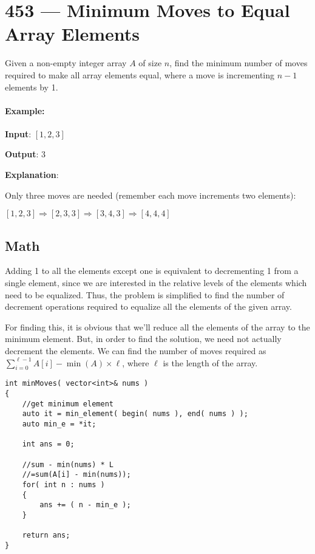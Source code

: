 \section{453 --- Minimum Moves to Equal Array Elements}
Given a non-empty integer array $A$ of size $n$, find the minimum number of moves required to make all array elements equal, where a move is incrementing $n - 1$ elements by 1.

\paragraph{Example:}

\begin{flushleft}
\textbf{Input}: $[1,2,3]$

\textbf{Output}: 3

\textbf{Explanation}: 

Only three moves are needed (remember each move increments two elements):

$[1,2,3]  \Longrightarrow  [2,3,3]  \Longrightarrow  [3,4,3] \Longrightarrow  [4,4,4]$
\end{flushleft}

\subsection{Math}
Adding 1 to all the elements except one is equivalent to decrementing 1 from a single element, since we are interested in the relative levels of the elements which need to be equalized. Thus, the problem is simplified to find the number of decrement operations required to equalize all the elements of the given array. 

For finding this, it is obvious that we'll reduce all the elements of the array to the minimum element. But, in order to find the solution, we need not actually decrement the elements. We can find the number of moves required as $\sum\limits_{i=0}^{\ell-1} A[i] - \min(A)\times \ell$, where $\ell$ is the length of the array.

\setcounter{lstlisting}{0}
\begin{lstlisting}[style=customc, caption={Math}]
int minMoves( vector<int>& nums )
{
    //get minimum element
    auto it = min_element( begin( nums ), end( nums ) );
    auto min_e = *it;

    int ans = 0;

    //sum - min(nums) * L
    //=sum(A[i] - min(nums));
    for( int n : nums )
    {
        ans += ( n - min_e );
    }

    return ans;
}
\end{lstlisting}

